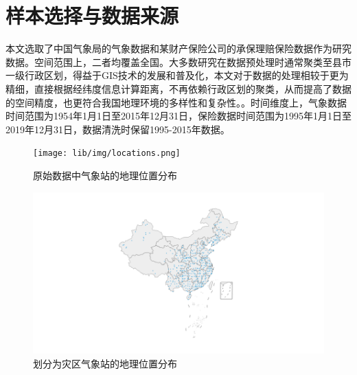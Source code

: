 \section{样本选择与数据来源}\label{sec:data}

本文选取了中国气象局的气象数据和某财产保险公司的承保理赔保险数据作为研究数据。空间范围上，二者均覆盖全国。大多数研究在数据预处理时通常聚类至县市一级行政区划\citep{0Do,杨娜娜2019自然灾害与企业现金持有}，得益于GIS技术的发展和普及化，本文对于数据的处理相较于更为精细，直接根据经纬度信息计算距离，不再依赖行政区划的聚类，从而提高了数据的空间精度，也更符合我国地理环境的多样性和复杂性。。时间维度上，气象数据时间范围为1954年1月1日至2015年12月31日，保险数据时间范围为1995年1月1日至2019年12月31日，数据清洗时保留1995-2015年数据。

\begin{figure}[H]
    \centering
    \begin{minipage}{0.48\linewidth}
        \texttt{[image: lib/img/locations.png]}
        \caption{原始数据中气象站的地理位置分布}
        \label{fig:location}
    \end{minipage}
    \begin{minipage}{0.48\linewidth}
        \includegraphics[width=\textwidth, trim=200 0 200 0]{lib/img/near.png}
        \caption{划分为灾区气象站的地理位置分布}
    \end{minipage}
\end{figure}
